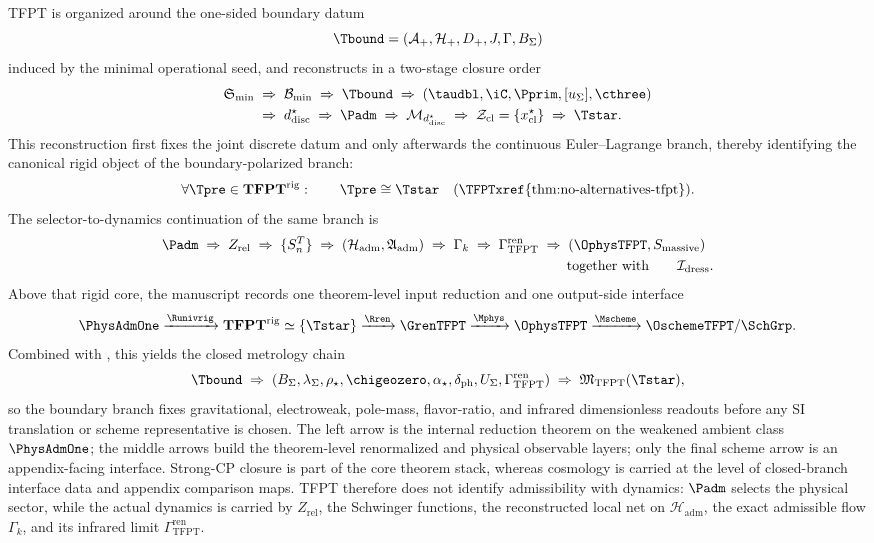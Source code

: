 TFPT is organized around the one-sided boundary datum
\[
\Tbound=(\mathcal A_+,\mathcal H_+,D_+,J,\Gamma,B_\Sigma)
\]
induced by the minimal operational seed, and reconstructs in a two-stage closure order
\[
\begin{aligned}
\mathfrak S_{\min}
&\;\Rightarrow\;
\mathcal B_{\min}
\;\Rightarrow\;
\Tbound
\;\Rightarrow\;
(\taudbl,\iC,\Pprim,[u_\Sigma],\cthree)\\
&\;\Rightarrow\;
d^\star_{\mathrm{disc}}
\;\Rightarrow\;
\Padm
\;\Rightarrow\;
\mathcal M_{d^\star_{\mathrm{disc}}}
\;\Rightarrow\;
\mathcal Z_{\mathrm{cl}}=\{x^\star_{\mathrm{cl}}\}
\;\Rightarrow\;
\Tstar.
\end{aligned}
\]
This reconstruction first fixes the joint discrete datum and only afterwards the continuous
Euler--Lagrange branch, thereby identifying the canonical rigid object of the boundary-polarized
branch:
\[
\forall \Tpre\in\mathbf{TFPT}^{\mathrm{rig}}:\qquad
\Tpre\cong \Tstar
\quad\text{(\TFPTxref{thm:no-alternatives-tfpt})}.
\]
The selector-to-dynamics continuation of the same branch is
\[
\Padm
\;\Rightarrow\;
Z_{\mathrm{rel}}
\;\Rightarrow\;
\{S_n^T\}
\;\Rightarrow\;
(\mathcal H_{\mathrm{adm}},\mathfrak A_{\mathrm{adm}})
\;\Rightarrow\;
\Gamma_k
\;\Rightarrow\;
\begin{aligned}[t]
\Gamma_{\mathrm{TFPT}}^{\mathrm{ren}}
&\;\Rightarrow\;
(\OphysTFPT,S_{\mathrm{massive}})\\
&\qquad\text{together with}\qquad
\mathcal I_{\mathrm{dress}}.
\end{aligned}
\]
Above that rigid core, the manuscript records one theorem-level input reduction and one output-side
interface
\[
\PhysAdmOne
\xrightarrow{\Runivrig}
\mathbf{TFPT}^{\mathrm{rig}}
\simeq
\{\Tstar\}
\xrightarrow{\Rren}
\GrenTFPT
\xrightarrow{\Mphys}
\OphysTFPT
\xrightarrow{\Mscheme}
\OschemeTFPT/\SchGrp.
\]
Combined with , this yields the closed metrology chain
\[
\Tbound
\;\Rightarrow\;
(B_\Sigma,\lambda_\Sigma,\rho_\star,\chigeozero,\alpha_\star,\delta_{\mathrm{ph}},U_\Sigma,\Gamma_{\mathrm{TFPT}}^{\mathrm{ren}})
\;\Rightarrow\;
\mathfrak M_{\mathrm{TFPT}}(\Tstar),
\]
so the boundary branch fixes gravitational, electroweak, pole-mass, flavor-ratio, and infrared
dimensionless readouts before any SI translation or scheme representative is chosen.
The left arrow is the internal reduction theorem on the weakened ambient class $\PhysAdmOne$; the
middle arrows build the theorem-level renormalized and physical observable layers; only the final
scheme arrow is an appendix-facing interface. Strong-CP closure is part of the core theorem stack,
whereas cosmology is carried at the level of closed-branch interface data and appendix comparison
maps. TFPT therefore does not identify
admissibility with dynamics: $\Padm$ selects the physical sector, while the actual dynamics is
carried by $Z_{\mathrm{rel}}$, the Schwinger functions, the reconstructed local net on
$\mathcal H_{\mathrm{adm}}$, the exact admissible flow $\Gamma_k$, and its infrared limit
$\Gamma_{\mathrm{TFPT}}^{\mathrm{ren}}$.

